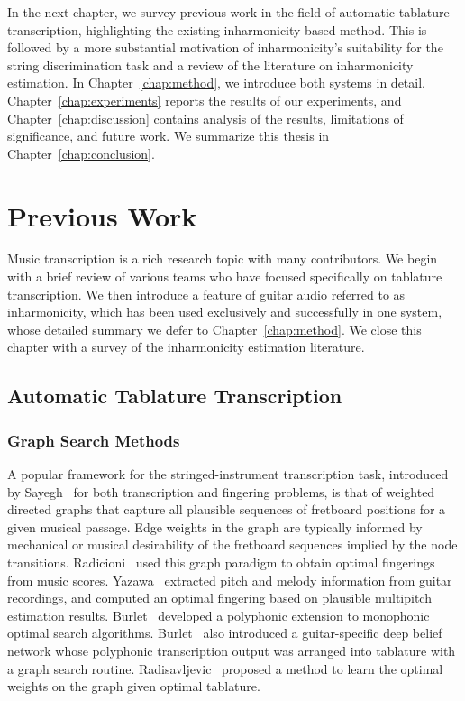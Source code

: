\documentclass[12pt]{cmuthesis}
\begin{document}
In the next chapter, we survey previous work in the field of automatic tablature transcription, highlighting the existing inharmonicity-based method. This is followed by a more substantial motivation of inharmonicity's suitability for the string discrimination task and a review of the literature on inharmonicity estimation. In Chapter~\ref{chap:method}, we introduce both systems in detail. Chapter~\ref{chap:experiments} reports the results of our experiments, and Chapter~\ref{chap:discussion} contains analysis of the results, limitations of significance, and future work. We summarize this thesis in Chapter~\ref{chap:conclusion}.

\noindent
\chapter{Previous Work}
\label{chap:lit-review}
Music transcription is a rich research topic with many contributors. We begin with a brief review of various teams who have focused specifically on tablature transcription. We then introduce a feature of guitar audio referred to as inharmonicity, which has been used exclusively and successfully in one system, whose detailed summary we defer to Chapter~\ref{chap:method}. We close this chapter with a survey of the inharmonicity estimation literature.

\section{Automatic Tablature Transcription}
\subsection{Graph Search Methods}
A popular framework for the stringed-instrument transcription task, introduced by Sayegh~\cite{sayegh1989} for both transcription and fingering problems, is that of weighted directed graphs that capture all plausible sequences of fretboard positions for a given musical passage. Edge weights in the graph are typically informed by mechanical or musical desirability of the fretboard sequences implied by the node transitions. Radicioni~\cite{radicioni2005} used this graph paradigm to obtain optimal fingerings from music scores. Yazawa~\cite{yazawa2013} extracted pitch and melody information from guitar recordings, and computed an optimal fingering based on plausible multipitch estimation results. Burlet~\cite{burlet2013} developed a polyphonic extension to monophonic optimal search algorithms. Burlet~\cite{burlet2015} also introduced a guitar-specific deep belief network whose polyphonic transcription output was arranged into tablature with a graph search routine. Radisavljevic~\cite{radisav2004} proposed a method to learn the optimal weights on the graph given optimal tablature.
\end{document}
